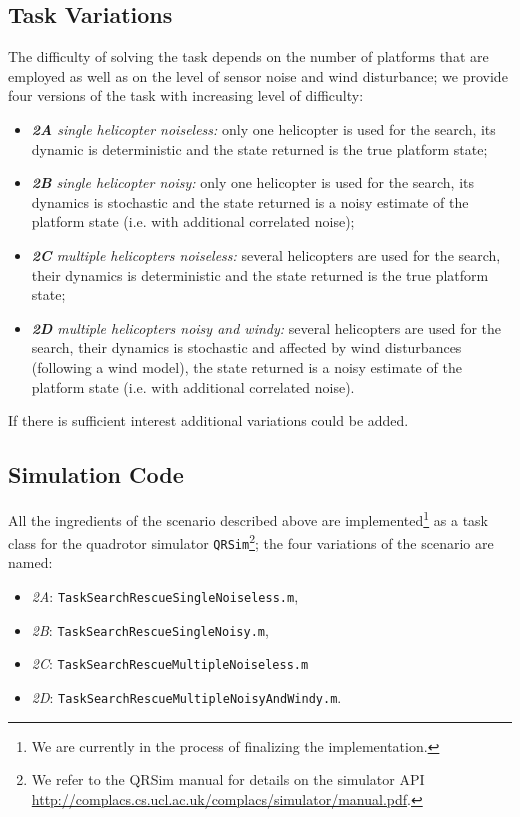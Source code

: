 \documentclass[a4paper,11pt]{report}
\newcommand{\webman}{\url{http://complacs.cs.ucl.ac.uk/complacs/simulator/manual.pdf}\xspace}
\newcommand\mytexttt[1]{\texttt{\hyphenchar\font=45\relax #1}}
\begin{document}
\subsection{Task Variations} \label{Variations}
The difficulty of solving the task depends on the number of platforms that are employed as well as on the level of sensor noise and wind disturbance; we provide four versions of the task with increasing level of difficulty:
\begin{itemize}
 \item \textit{\textbf{2A} single helicopter noiseless:} only one helicopter is used for the search, its dynamic is deterministic and the state returned is the true platform state;
 \item \textit{\textbf{2B} single helicopter noisy:} only one helicopter is used for the search, its dynamics is stochastic and the state returned is a noisy estimate of the platform state (i.e. with additional correlated noise);
 \item \textit{\textbf{2C} multiple helicopters noiseless:} several helicopters are used for the search, their dynamics is deterministic and the state returned is the true platform state;
 \item \textit{\textbf{2D} multiple helicopters noisy and windy:} several helicopters are used for the search, their dynamics is stochastic and affected by wind disturbances (following a wind model), the state returned is a noisy estimate of the platform state (i.e. with additional correlated noise).
\end{itemize}

If there is sufficient interest additional variations could be added.

\subsection{Simulation Code} \label{SearchRescueSim}

All the ingredients of the scenario described above are implemented\footnote{We are currently in the process of finalizing the implementation.} as a task class for the quadrotor simulator \texttt{QRSim}\footnote{We refer to the QRSim manual for details on the simulator API \webman.}; the four variations of the scenario are named:
\begin{itemize}
\item\textit{2A}: \mytexttt{TaskSearchRescueSingleNoiseless.m}, 
\item\textit{2B}: \mytexttt{TaskSearchRescueSingleNoisy.m}, 
\item\textit{2C}: \mytexttt{TaskSearchRescueMultipleNoiseless.m} 
\item\textit{2D}: \mytexttt{TaskSearchRescueMultipleNoisyAndWindy.m}. 
\end{itemize}
\end{document}
